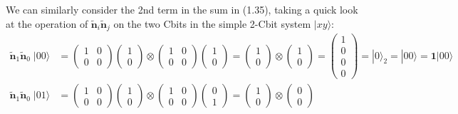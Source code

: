 \documentclass{article}
\begin{document}
We can similarly consider the 2nd term in the sum in (1.35), taking a quick look at the operation of $\bm{\widetilde{n}}_i\bm{\widetilde{n}}_j$ on the two Cbits in the simple 2-Cbit system $|xy\rangle$:
\begin{align*}
\bm{\widetilde{n}}_1\bm{\widetilde{n}}_0 \; |00\rangle
  &= \begin{pmatrix}1 & 0\\0 & 0\end{pmatrix}
     \begin{pmatrix}1\\0\end{pmatrix}
     \otimes
     \begin{pmatrix}1 & 0\\0 & 0\end{pmatrix}
     \begin{pmatrix}1\\0\end{pmatrix}
     = \begin{pmatrix}1\\0\end{pmatrix}
     \otimes
     \begin{pmatrix}1\\0\end{pmatrix}
     = \begin{pmatrix}1\\0\\0\\0\end{pmatrix}
     = |0\rangle_2
     = |00\rangle
     = \bm{1} |00\rangle\\
\bm{\widetilde{n}}_1\bm{\widetilde{n}}_0 \; |01\rangle
  &= \begin{pmatrix}1 & 0\\0 & 0\end{pmatrix}
     \begin{pmatrix}1\\0\end{pmatrix}
     \otimes
     \begin{pmatrix}1 & 0\\0 & 0\end{pmatrix}
     \begin{pmatrix}0\\1\end{pmatrix}
     = \begin{pmatrix}1\\0\end{pmatrix}
     \otimes
     \begin{pmatrix}0\\0\end{pmatrix}

\end{align*}
\end{document}
